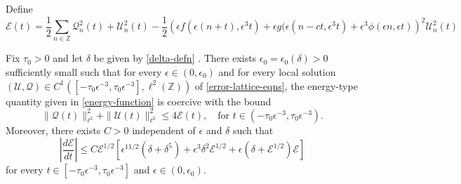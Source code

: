 Define 
\begin{equation}\label{energy-function}
	\mathcal E(t) = \frac 1 2 \sum_{n\in \mathbb Z} \mathcal Q_n^2(t) + \mathcal U_n^2(t) - \frac 1 2 \left(\epsilon f(\epsilon(n+t), \epsilon^3 t) + \epsilon g(\epsilon(n-ct, \epsilon^3t) + \epsilon^3 \phi(\epsilon n, \epsilon t)\right)^2 \mathcal U_n^2(t)
\end{equation}
\begin{lem}\label{energy-coercive-bounds-lem}
	Fix \(\tau_0>0 \) and let \(\delta\) be given by \cref{delta-defn} . There exists \(\epsilon_0 = \epsilon_0(\delta) >0\) sufficiently small such that for every \(\epsilon \in (0,\epsilon_0)\) and for every local solution \((\mathcal U, \mathcal Q) \in C^1([-\tau_0\epsilon^{-3}, \tau_0\epsilon^{-3}], \ell^2(\mathbb Z))\) of \cref{error-lattice-eqns}, the energy-type quantity given in \cref{energy-function} is coercive with the bound
	\begin{equation}\label{coercive-bound}
		\|\mathcal Q(t) \|_{\ell^2}^2 + \| \mathcal U (t) \|_{\ell^2}^2 \leq  4 \mathcal E(t), \quad \text{for } t\in(-\tau_0\epsilon^{-3}, \tau_0\epsilon^{-3}).
	\end{equation}
	Moreover, there exists \(C> 0\) independent of \(\epsilon\) and \(\delta\) such that 
	\begin{equation}
		\left|\frac{d\mathcal E}{dt} \right| \leq C \mathcal E^{1/2}\left[ \epsilon^{11/2} (\delta + \delta^5)  + \epsilon^3\delta^2\mathcal E^{1/2} + \epsilon(\delta + \mathcal{E}^{1/2})\mathcal E\right]
	\end{equation}
	for every \(t\in [-\tau_0\epsilon^{-3}, \tau_0\epsilon^{-3}]\) and \(\epsilon \in (0,\epsilon_0)\). 	  
\end{lem}
